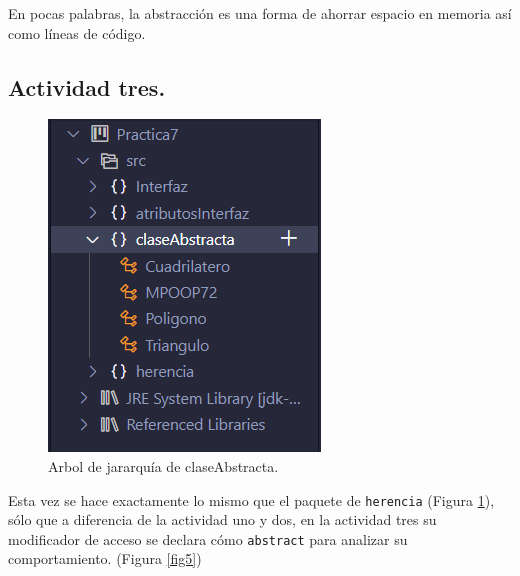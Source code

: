 \documentclass[conference]{IEEEtran}
\begin{document}
            \medskip{}

            En pocas palabras, la abstracción es una forma de ahorrar espacio en memoria así como líneas de código.

        \subsection{Actividad tres.}

        \begin{figure}[htbp]
            \centerline{\includegraphics[scale=0.4]{./pics/5}}
            \caption{Arbol de jararquía de claseAbstracta.}
            \label{fig4}
        \end{figure}

        Esta vez se hace exactamente lo mismo que el paquete de \texttt{herencia} (Figura \ref{fig4}), sólo que a diferencia de la actividad uno y dos, en la actividad tres su modificador de acceso se declara cómo \texttt{abstract} para analizar su comportamiento. (Figura \ref{fig5})
            
\end{document}
